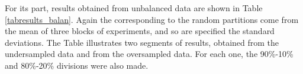 \documentclass{llncs}
\begin{document}
For its part, results obtained from unbalanced data are shown in Table \ref{tabresults_balan}. Again the corresponding to the random partitions come from the mean of three blocks of experiments, and so are specified the standard deviations. The Table illustrates two segments of results, obtained from the undersampled data and from the oversampled data. For each one, the 90\%-10\% and 80\%-20\% divisions were also made.

% 
% 
% 
% 
% 
\end{document}
